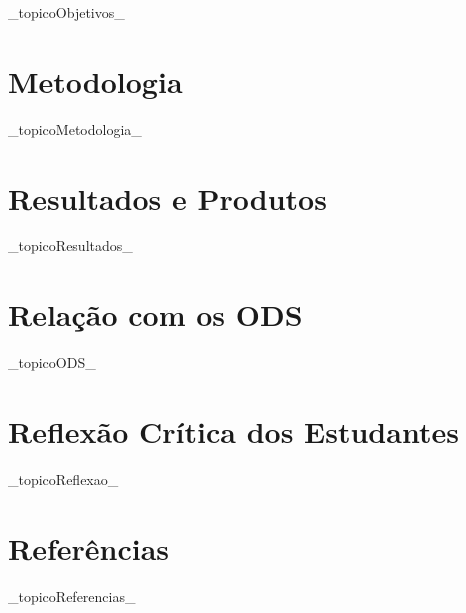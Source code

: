 \documentclass[12pt,a4paper]{article}
\begin{document}
\_topicoObjetivos\_


\section*{Metodologia}

\_topicoMetodologia\_


\section*{Resultados e Produtos}

\_topicoResultados\_


\section*{Relação com os ODS}

\_topicoODS\_


\section*{Reflexão Crítica dos Estudantes}

\_topicoReflexao\_


\section*{Referências}

\_topicoReferencias\_
\end{document}
